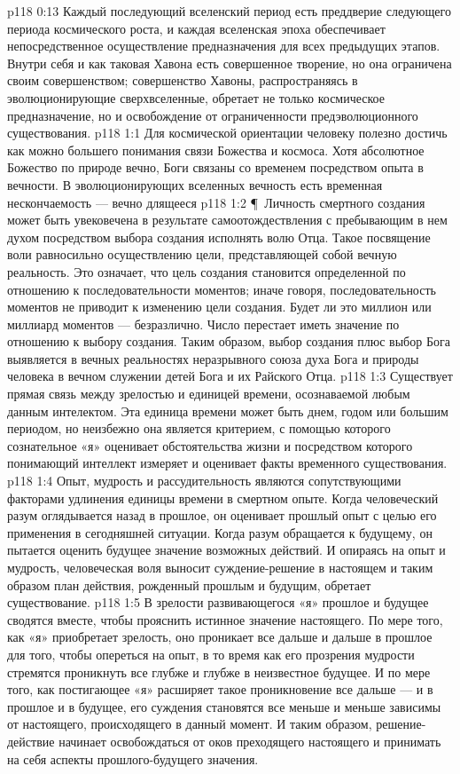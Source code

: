 \vs p118 0:13 Каждый последующий вселенский период есть преддверие следующего периода космического роста, и каждая вселенская эпоха обеспечивает непосредственное осуществление предназначения для всех предыдущих этапов. Внутри себя и как таковая Хавона есть совершенное творение, но она ограничена своим совершенством; совершенство Хавоны, распространяясь в эволюционирующие сверхвселенные, обретает не только космическое предназначение, но и освобождение от ограниченности предэволюционного существования.
\vs p118 1:1 Для космической ориентации человеку полезно достичь как можно большего понимания связи Божества и космоса. Хотя абсолютное Божество по природе вечно, Боги связаны со временем посредством опыта в вечности. В эволюционирующих вселенных вечность есть временная нескончаемость --- вечно длящееся 
\vs p118 1:2 \P\ Личность смертного создания может быть увековечена в результате самоотождествления с пребывающим в нем духом посредством выбора создания исполнять волю Отца. Такое посвящение воли равносильно осуществлению цели, представляющей собой вечную реальность. Это означает, что цель создания становится определенной по отношению к последовательности моментов; иначе говоря, последовательность моментов не приводит к изменению цели создания. Будет ли это миллион или миллиард моментов --- безразлично. Число перестает иметь значение по отношению к выбору создания. Таким образом, выбор создания плюс выбор Бога выявляется в вечных реальностях неразрывного союза духа Бога и природы человека в вечном служении детей Бога и их Райского Отца.
\vs p118 1:3 Существует прямая связь между зрелостью и единицей времени, осознаваемой любым данным интелектом. Эта единица времени может быть днем, годом или большим периодом, но неизбежно она является критерием, с помощью которого сознательное «я» оценивает обстоятельства жизни и посредством которого понимающий интеллект измеряет и оценивает факты временного существования.
\vs p118 1:4 Опыт, мудрость и рассудительность являются сопутствующими факторами удлинения единицы времени в смертном опыте. Когда человеческий разум оглядывается назад в прошлое, он оценивает прошлый опыт с целью его применения в сегодняшней ситуации. Когда разум обращается к будущему, он пытается оценить будущее значение возможных действий. И опираясь на опыт и мудрость, человеческая воля выносит суждение\hyp{}решение в настоящем и таким образом план действия, рожденный прошлым и будущим, обретает существование.
\vs p118 1:5 В зрелости развивающегося «я» прошлое и будущее сводятся вместе, чтобы прояснить истинное значение настоящего. По мере того, как «я» приобретает зрелость, оно проникает все дальше и дальше в прошлое для того, чтобы опереться на опыт, в то время как его прозрения мудрости стремятся проникнуть все глубже и глубже в неизвестное будущее. И по мере того, как постигающее «я» расширяет такое проникновение все дальше --- и в прошлое и в будущее, его суждения становятся все меньше и меньше зависимы от настоящего, происходящего в данный момент. И таким образом, решение\hyp{}действие начинает освобождаться от оков преходящего настоящего и принимать на себя аспекты прошлого\hyp{}будущего значения.
